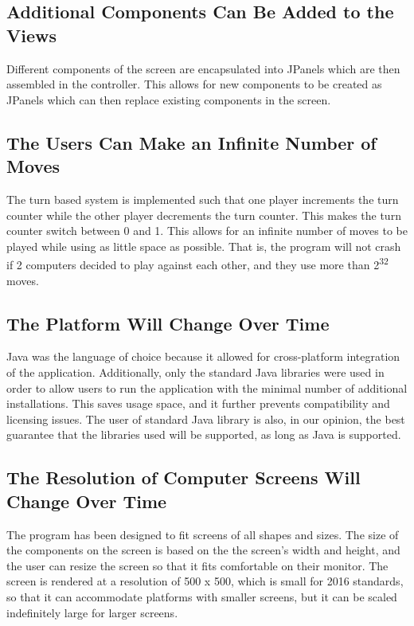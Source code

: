 \documentclass{article}
\begin{document}
{\subsection{Additional Components Can Be Added to the Views}
Different components of the screen are encapsulated into JPanels which are then assembled in the controller. This allows for new components to be created as JPanels which can then replace existing components in the screen.

\subsection{The Users Can Make an Infinite Number of Moves}
The turn based system is implemented such that one player increments the turn counter while the other player decrements the turn counter. This makes the turn counter switch between 0 and 1. This allows for an infinite number of moves to be played while using as little space as possible. That is, the program will not crash if 2 computers decided to play against each other, and they use more than 2\textsuperscript{32} moves.

\subsection{The Platform Will Change Over Time}
Java was the language of choice because it allowed for cross-platform integration of the application. Additionally, only the standard Java libraries were used in order to allow users to run the application with the minimal number of additional installations. This saves usage space, and it further prevents compatibility and licensing issues. The user of standard Java library is also, in our opinion, the best guarantee that the libraries used will be supported, as long as Java is supported.

\subsection{The Resolution of Computer Screens Will Change Over Time}
The program has been designed to fit screens of all shapes and sizes. The size of the components on the screen is based on the the screen's width and height, and the user can resize the screen so that it fits comfortable on their monitor. The screen is rendered at a resolution of 500 x 500, which is small for 2016 standards, so that it can accommodate platforms with smaller screens, but it can be scaled indefinitely large for larger screens.

}
\end{document}
